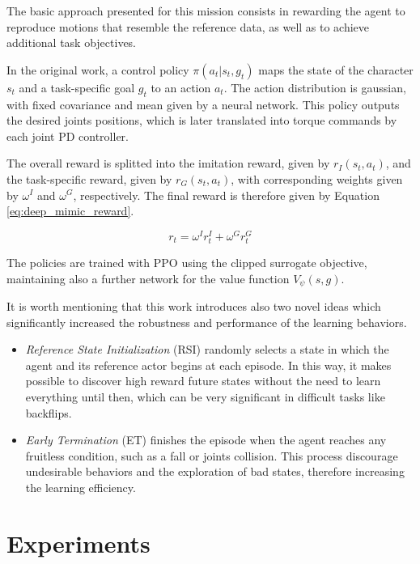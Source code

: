 The basic approach presented for this mission consists in rewarding the agent to reproduce motions that resemble the reference data, as well as to achieve additional task objectives.

In the original work, a control policy $\pi (a_t|s_t,g_t)$ maps the state of the character $s_t$ and a task-specific goal $g_t$ to an action $a_t$. The action distribution is gaussian, with fixed covariance and mean given by a neural network. This policy outputs the desired joints positions, which is later translated into torque commands by each joint PD controller.

The overall reward is splitted into the imitation reward, given by $r_I(s_t,a_t)$, and the task-specific reward, given by $r_G(s_t,a_t)$, with corresponding weights given by $\omega^I$ and $\omega^G$, respectively. The final reward is therefore given by Equation \eqref{eq:deep_mimic_reward}.

\begin{equation}
r_t = \omega^I r_t^I + \omega^G r_t^G
\label{eq:deep_mimic_reward}
\end{equation}

The policies are trained with PPO using the clipped surrogate objective, maintaining also a further network for the value function $V_{\psi}(s,g)$.

It is worth mentioning that this work introduces also two novel ideas which significantly increased the robustness and performance of the learning behaviors. 

\begin{itemize}
\item \textit{Reference State Initialization} (RSI) randomly selects a state in which the agent and its reference actor begins at each episode. In this way, it makes possible to discover high reward future states without the need to learn everything until then, which can be very significant in difficult tasks like backflips.

\item \textit{Early Termination} (ET) finishes the episode when the agent reaches any fruitless condition, such as a fall or joints collision. This process discourage undesirable behaviors and the exploration of bad states, therefore increasing the learning efficiency.
\end{itemize}

\section{Experiments}

